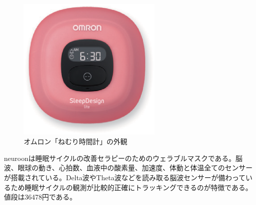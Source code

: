 \begin{figure}[htbp]
\begin{center}
\includegraphics[width=7cm]{eps/omuron.eps}
\caption{オムロン「ねむり時間計」の外観}
\label{omuron}
\end{center}
\end{figure}

neuroonは睡眠サイクルの改善セラピーのためのウェラブルマスクである。脳波、眼球の動き、心拍数、血液中の酸素量、加速度、体動と体温全てのセンサーが搭載されている\cite{neuroon}。Delta波やTheta波などを読み取る脳波センサーが備わっているため睡眠サイクルの観測が比較的正確にトラッキングできるのが特徴である。値段は36478円である。

